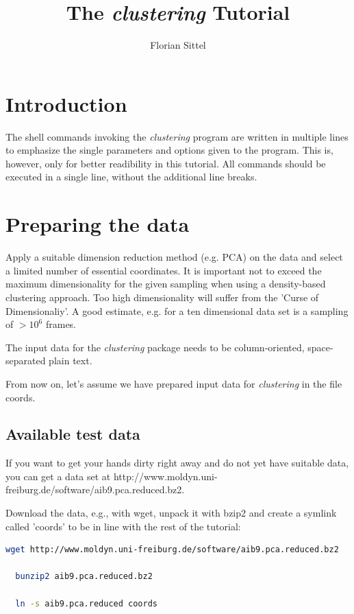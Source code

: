 \documentclass[12pt,a4paper,twoside,english,fleqn]{article}
\begin{document}
\title{\vspace{-3cm}The \emph{clustering} Tutorial}
\author{Florian Sittel}
\maketitle

\section{Introduction}
The shell commands invoking the \emph{clustering} program are written in
multiple lines to emphasize the single parameters and options given to the
program. This is, however, only for better readibility in this tutorial.
All commands should be executed in a single line, without the additional line
breaks.


\section{Preparing the data}
Apply a suitable dimension reduction method (e.g. PCA) on the data and select a
limited number of essential coordinates.
It is important not to exceed the maximum dimensionality for the given sampling
when using a density-based clustering approach.
Too high dimensionality will suffer from the 'Curse of Dimensionaliy'.
A good estimate, e.g. for a ten dimensional data set is a sampling of $> 10^6$
frames.

The input data for the \emph{clustering} package needs to be column-oriented,
space-separated plain text.

From now on, let's assume we have prepared input data for \emph{clustering} in
the file {\ttfamily coords}.

\subsection{Available test data}
If you want to get your hands dirty right away and do not yet have suitable
data, you can get a data set at
http://www.moldyn.uni-freiburg.de/software/aib9.pca.reduced.bz2.

Download the data, e.g., with {\ttfamily wget}, unpack it with
{\ttfamily bzip2} and create a symlink called 'coords' to be in line with
the rest of the tutorial:
\begin{lstlisting}[language=bash,basicstyle=\ttfamily]
  wget http://www.moldyn.uni-freiburg.de/software/aib9.pca.reduced.bz2

  bunzip2 aib9.pca.reduced.bz2

  ln -s aib9.pca.reduced coords
\end{lstlisting}
\end{document}
